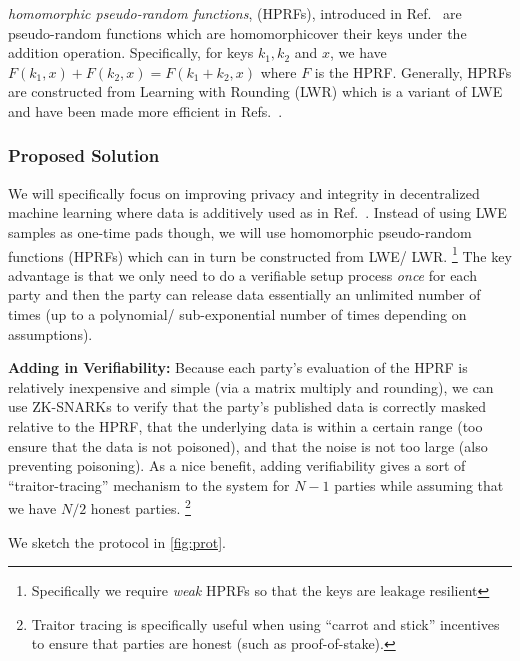 \documentclass[11pt]{article}
\begin{document}
\emph{homomorphic pseudo-random functions}, (HPRFs), introduced in Ref.~\cite{boneh2013key} are pseudo-random functions which are homomorphicover their keys under the addition operation.
Specifically, for keys $k_1, k_2$ and $x$, we have $F(k_1, x) + F(k_2, x) = F(k_1 + k_2, x)$ where $F$ is the HPRF.
Generally, HPRFs are constructed from Learning with Rounding (LWR) which is a variant of LWE and have been made more efficient in Refs.~\cite{newKeyHom, kim2020key}.


\subsubsection*{Proposed Solution}
We will specifically focus on improving privacy and integrity in decentralized machine learning where data is additively used as in Ref.~\cite{stevens2021efficientdifferentiallyprivatesecure}.
Instead of using LWE samples as one-time pads though, we will use homomorphic pseudo-random functions (HPRFs)  which can in turn be constructed from LWE/ LWR.
\footnote{Specifically we require \emph{weak} HPRFs so that the keys are leakage resilient}
The key advantage is that we only need to do a verifiable setup process \emph{once} for each party and then the party can release data essentially an unlimited number of times (up to a polynomial/ sub-exponential number of times depending on assumptions).

\textbf{Adding in Verifiability:} Because each party's evaluation of the HPRF is relatively inexpensive and simple (via a matrix multiply and rounding), we can use ZK-SNARKs to verify that the party's published data is correctly masked relative to the HPRF, that the underlying data is within a certain range (too ensure that the data is not poisoned), and that the noise is not too large (also preventing poisoning).
As a nice benefit, adding verifiability gives a sort of ``traitor-tracing'' mechanism to the system for $N - 1$ parties while assuming that we have $N /2$ honest parties.
\footnote{Traitor tracing is specifically useful when using ``carrot and stick'' incentives to ensure that parties are honest (such as proof-of-stake).}

We sketch the protocol in \cref{fig:prot}.
\end{document}
